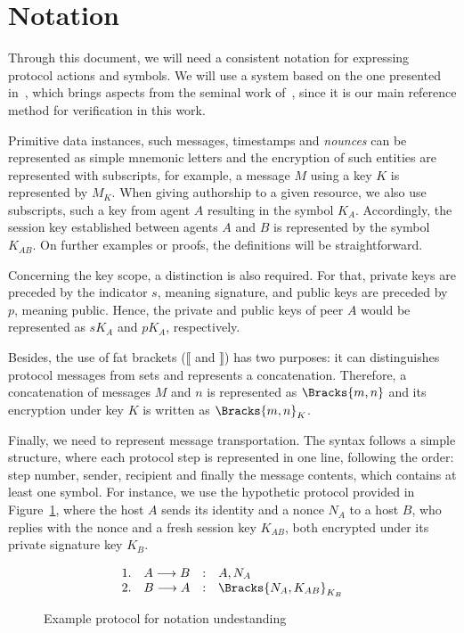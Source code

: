 \section{Notation}
Through this document, we will need a consistent notation for expressing protocol actions and symbols. We will use a system based on the one presented in~\cite{Bella2007}, which brings aspects from the seminal work of~\cite{Burrows90}, since it is our main reference method for verification in this work.

Primitive data instances, such messages, timestamps and \textit{nounces} can be represented as simple mnemonic letters and the encryption of such entities are represented with subscripts, for example, a message \(M\) using a key \(K\) is represented by \(M_K\). When giving authorship to a given resource, we also use subscripts, such a key from agent \(A\) resulting in the symbol \(K_A\). Accordingly, the session key established between agents \(A\) and \(B\) is represented by the symbol \(K_{AB}\). On further examples or proofs, the definitions will be straightforward.

Concerning the key scope, a distinction is also required. For that, private keys are preceded by the indicator \(s\), meaning signature, and public keys are preceded by \(p\), meaning public. Hence, the private and public keys of peer \(A\) would be represented as \(sK_A\) and \(pK_A\), respectively.

Besides, the use of fat brackets (\(\lBrack \) and \(\rBrack \)) has two purposes: it can distinguishes protocol messages from sets and represents a concatenation. Therefore, a concatenation of messages \(M\) and \(n\) is represented as \(\Bracks{m,n}\) and its encryption under key \(K\) is written as \(\Bracks{m,n}_K\).

Finally, we need to represent message transportation. The syntax follows a simple structure, where each protocol step is represented in one line, following the order: step number, sender, recipient and finally the message contents, which contains at least one symbol. For instance, we use the hypothetic protocol provided in Figure~\ref{prt:notation-example}, where the host \(A\) sends its identity and a nonce \(N_A\) to a host \(B\), who replies with the nonce and a fresh session key \(K_{AB}\), both encrypted under its private signature key \(K_B\).

\begin{figure}[ht]\label{prt:notation-example}
  \centering
    \[
    \begin{array}{rlcl}
      1. & A \longrightarrow B &:& A, N_A \\
      2. & B \longrightarrow A &:& \Bracks{N_A, K_{AB}}_{K_B} \\
    \end{array}
    \]
  \caption{Example protocol for notation undestanding}
\end{figure}

